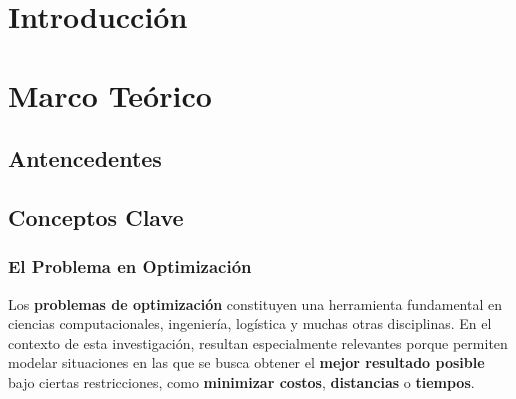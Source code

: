 \documentclass[12pt,titlepage,twoside,openright]{book}
\makeatletter
\def\cleardoublepage{\clearpage\if@twoside \ifodd\c@page\else
\hbox{}
\thispagestyle{empty}
\newpage
\if@twocolumn\hbox{}\newpage\fi\fi\fi}
\makeatother
\begin{document}

\setcounter{tocdepth}{3}
\setcounter{secnumdepth}{3}


\tableofcontents
\cleardoublepage
\listoffigures
\cleardoublepage
\listoftables
\cleardoublepage
\listofmyequations
\cleardoublepage


\mainmatter
\pagestyle{fancy}
\fancyhf{}
\fancyhead[RO,LE]{\bfseries \thepage}
\fancyhead[LO]{\nouppercase{\rightmark}}
\fancyhead[RE]{\nouppercase{\leftmark}}
\fancyfoot{}

\setlength{\parindent}{0pt}
\setlength{\parskip}{1.5ex}

\newcommand{\tab}{\hspace*{1cm}}

\chapter{Introducción}
\label{cap:introduccion}

\chapter{Marco Teórico}
\label{cap:marco-teorico}
\section{Antencedentes}
\section{Conceptos Clave}
\subsection{El Problema en Optimización}

Los \textbf{problemas de optimización} constituyen una herramienta fundamental en ciencias computacionales, ingeniería, logística y muchas otras disciplinas. En el contexto de esta investigación, resultan especialmente relevantes porque permiten modelar situaciones en las que se busca obtener el \textbf{mejor resultado posible} bajo ciertas restricciones, como \textbf{minimizar costos}, \textbf{distancias} o \textbf{tiempos}.
\end{document}
